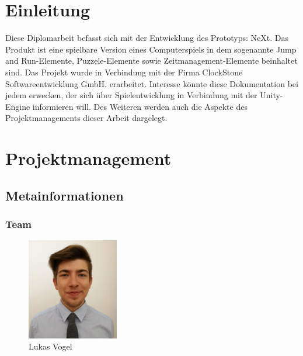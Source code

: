 

\def \currentAuthor {Lukas Vogel} %


\chapter{Einleitung}
Diese Diplomarbeit befasst sich mit der Entwicklung des Prototyps: NeXt. Das Produkt ist eine spielbare Version eines Computerspiels in dem sogenannte Jump and Run-Elemente, Puzzele-Elemente sowie Zeitmanagement-Elemente beinhaltet sind. Das Projekt wurde in Verbindung mit der Firma ClockStone Softwareentwicklung GmbH. erarbeitet. Interesse könnte diese Dokumentation bei jedem erwecken,	 der sich über Spielentwicklung in Verbindung mit der Unity-Engine  informieren will. Des Weiteren werden auch die Aspekte des Projektmanagements dieser Arbeit dargelegt.  

\chapter{Projektmanagement}

\section{Metainformationen}
\subsection{Team}

	\begin{figure}[H]
	\centering
		\includegraphics[width=4cm]{images/LukasVogel.png}
		\caption{Lukas Vogel}		
	\end{figure}

